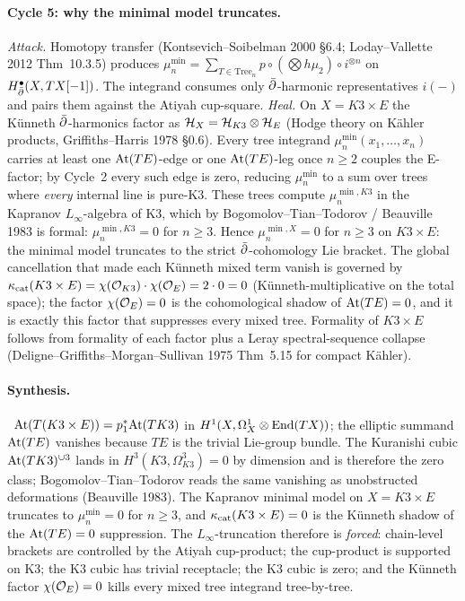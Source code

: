 \paragraph{Cycle 5: why the minimal model truncates.}
\emph{Attack.}
Homotopy transfer (Kontsevich--Soibelman 2000 \S 6.4; Loday--Vallette
2012 Thm~10.3.5) produces
$\mu_n^{\min} = \sum_{T \in \mathrm{Tree}_n} p \circ (\bigotimes h
\mu_2) \circ i^{\otimes n}$ on $H^\bullet_{\bar\partial}(X, TX[-1])$. The
integrand consumes only $\bar\partial$-harmonic representatives $i(-)$ and
pairs them against the Atiyah cup-square.
\emph{Heal.}
On $X = K3 \times E$ the K\"unneth $\bar\partial$-harmonics factor as
$\mathcal{H}_{X} = \mathcal{H}_{K3} \otimes \mathcal{H}_E$ (Hodge theory on K\"ahler products,
Griffiths--Harris 1978 \S 0.6). Every tree integrand
$\mu_n^{\min}(x_1, \ldots, x_n)$ carries at least one $\mathrm{At}(TE)$-edge
or one $\mathrm{At}(TE)$-leg once $n \geq 2$ couples the E-factor; by Cycle~2
every such edge is zero, reducing $\mu_n^{\min}$ to a sum over trees
where \emph{every} internal line is pure-K3. These trees compute
$\mu_n^{\min, K3}$ in the Kapranov $L_\infty$-algebra of K3, which by
Bogomolov--Tian--Todorov / Beauville 1983 is formal: $\mu_n^{\min,K3}
= 0$ for $n \geq 3$. Hence $\mu_n^{\min, X} = 0$ for $n \geq 3$ on
$K3 \times E$: the minimal model truncates to the strict
$\bar\partial$-cohomology Lie bracket. The global cancellation that made
each K\"unneth mixed term vanish is governed by
$\kappa_{\mathrm{cat}}(K3 \times E) = \chi(\mathcal{O}_{K3}) \cdot \chi(\mathcal{O}_E) = 2 \cdot 0 =
0$ (K\"unneth-multiplicative on the total space); the factor
$\chi(\mathcal{O}_E) = 0$ is the cohomological shadow of $\mathrm{At}(TE) = 0$, and
it is exactly this factor that suppresses every mixed tree. Formality
of $K3 \times E$ follows from formality of each factor plus a Leray
spectral-sequence collapse (Deligne--Griffiths--Morgan--Sullivan 1975
Thm~5.15 for compact K\"ahler).

\paragraph{Synthesis.}
\ClaimStatusTheorem\ $\mathrm{At}(T(K3 \times E)) = p_1^*\mathrm{At}(TK3)$ in
$H^1(X, \Omega^1_X \otimes \mathrm{End}(TX))$; the elliptic summand
$\mathrm{At}(TE)$ vanishes because $TE$ is the trivial Lie-group bundle.
The Kuranishi cubic $\mathrm{At}(TK3)^{\cup 3}$ lands in
$H^3(K3, \Omega^3_{K3}) = 0$ by dimension and is therefore the zero
class; Bogomolov--Tian--Todorov reads the same vanishing as
unobstructed deformations (Beauville 1983). The Kapranov minimal
model on $X = K3 \times E$ truncates to
$\mu_n^{\min} = 0$ for $n \geq 3$, and
$\kappa_{\mathrm{cat}}(K3 \times E) = 0$ is the K\"unneth shadow of the
$\mathrm{At}(TE) = 0$ suppression. The $L_\infty$-truncation therefore is
\emph{forced}: chain-level brackets are controlled by the Atiyah
cup-product; the cup-product is supported on K3; the K3 cubic has
trivial receptacle; the K3 cubic is zero; and the K\"unneth factor
$\chi(\mathcal{O}_E) = 0$ kills every mixed tree integrand tree-by-tree.
